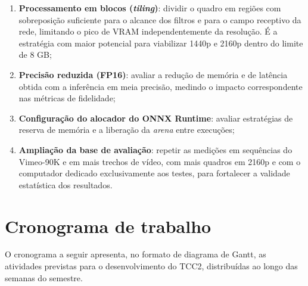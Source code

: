 \documentclass[
    12pt,                %
    openright,           %
    oneside,             %
    a4paper,             %
    english,             %
    brazil               %
]{abntex2}
\begin{document}
\begin{enumerate}
    \item \textbf{Processamento em blocos (\textit{tiling})}: dividir o quadro em regiões com sobreposição suficiente para o alcance dos filtros e para o campo receptivo da rede, limitando o pico de VRAM independentemente da resolução. É a estratégia com maior potencial para viabilizar 1440p e 2160p dentro do limite de 8 GB;
    \item \textbf{Precisão reduzida (FP16)}: avaliar a redução de memória e de latência obtida com a inferência em meia precisão, medindo o impacto correspondente nas métricas de fidelidade;
    \item \textbf{Configuração do alocador do ONNX Runtime}: avaliar estratégias de reserva de memória e a liberação da \textit{arena} entre execuções;
    \item \textbf{Ampliação da base de avaliação}: repetir as medições em sequências do Vimeo-90K \cite{Xue2019} e em mais trechos de vídeo, com mais quadros em 2160p e com o computador dedicado exclusivamente aos testes, para fortalecer a validade estatística dos resultados.
\end{enumerate}

\clearpage

\section{Cronograma de trabalho}
\label{sec:cronograma}

O cronograma a seguir apresenta, no formato de diagrama de Gantt, as atividades previstas para o desenvolvimento do TCC2, distribuídas ao longo das semanas do semestre.
\end{document}
